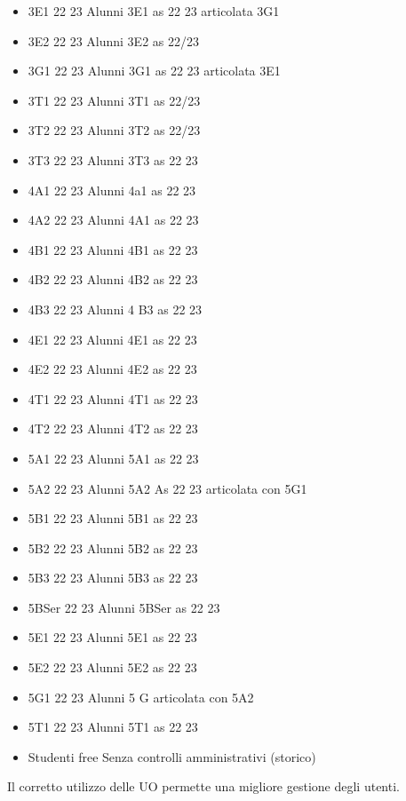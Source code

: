 \begin{itemize}
\begin{itemize}
\begin{itemize}
	\item 3E1 22 23
	Alunni 3E1 as 22 23 articolata 3G1	
	\item 3E2 22 23
	Alunni 3E2 as 22/23	
	\item 3G1 22 23
	Alunni 3G1 as 22 23 articolata 3E1	
	\item 3T1 22 23
	Alunni 3T1 as 22/23	
	\item 3T2 22 23
	Alunni 3T2 as 22/23	
	\item 3T3 22 23
	Alunni 3T3 as 22 23	
	\item 4A1 22 23
	Alunni 4a1 as 22 23	
	\item 4A2 22 23
	Alunni 4A1 as 22 23	
	\item 4B1 22 23
	Alunni 4B1 as 22 23	
	\item 4B2 22 23
	Alunni 4B2 as 22 23	
	\item 4B3 22 23
	Alunni 4 B3 as 22 23	
	\item 4E1 22 23
	Alunni 4E1 as 22 23	
	\item 4E2 22 23
	Alunni 4E2 as 22 23	
	\item 4T1 22 23
	Alunni 4T1 as 22 23	
	\item 4T2 22 23
	Alunni 4T2 as 22 23	
	\item 5A1 22 23
	Alunni 5A1 as 22 23	
	\item 5A2 22 23
	Alunni 5A2 As 22 23 articolata con 5G1	
	\item 5B1 22 23
	Alunni 5B1 as 22 23	
	\item 5B2 22 23
	Alunni 5B2 as 22 23	
	\item 5B3 22 23
	Alunni 5B3 as 22 23	
	\item 5BSer 22 23
	Alunni 5BSer as 22 23	
	\item 5E1 22 23
	Alunni 5E1 as 22 23	
	\item 5E2 22 23
	Alunni 5E2 as 22 23	
	\item 5G1 22 23
	Alunni 5 G articolata con 5A2	
	\item 5T1 22 23
	Alunni 5T1 as 22 23	
	\item Studenti free
	Senza controlli amministrativi (storico)
\end{itemize}
	\end{itemize}
\end{itemize} 

Il corretto utilizzo delle UO permette  una  migliore gestione degli utenti.
